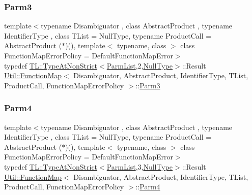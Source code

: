 \subsubsection{\texorpdfstring{Parm3}{Parm3}\hspace{0.1cm}{\footnotesize\ttfamily [2/2]}}
{\footnotesize\ttfamily template$<$typename Disambiguator , class Abstract\+Product , typename Identifier\+Type , class T\+List  = Null\+Type, typename Product\+Call  = Abstract\+Product ($\ast$)(), template$<$ typename, class $>$ class Function\+Map\+Error\+Policy = Default\+Function\+Map\+Error$>$ \\
typedef \mbox{\hyperlink{structUtil_1_1TL_1_1TypeAtNonStrict}{T\+L\+::\+Type\+At\+Non\+Strict}}$<$\mbox{\hyperlink{classUtil_1_1FunctionMap_a6cf0e6766cf6f20642ba61c4994bb477}{Parm\+List}},2,\mbox{\hyperlink{classUtil_1_1NullType}{Null\+Type}}$>$\+::Result \mbox{\hyperlink{classUtil_1_1FunctionMap}{Util\+::\+Function\+Map}}$<$ Disambiguator, Abstract\+Product, Identifier\+Type, T\+List, Product\+Call, Function\+Map\+Error\+Policy $>$\+::\mbox{\hyperlink{classUtil_1_1FunctionMap_a4578d42cd0723beba85654aa774d0145}{Parm3}}}

\mbox{\label{classUtil_1_1FunctionMap_a912703c1f39a6e219b2449183e48fb07}} 
\subsubsection{\texorpdfstring{Parm4}{Parm4}\hspace{0.1cm}{\footnotesize\ttfamily [1/2]}}
{\footnotesize\ttfamily template$<$typename Disambiguator , class Abstract\+Product , typename Identifier\+Type , class T\+List  = Null\+Type, typename Product\+Call  = Abstract\+Product ($\ast$)(), template$<$ typename, class $>$ class Function\+Map\+Error\+Policy = Default\+Function\+Map\+Error$>$ \\
typedef \mbox{\hyperlink{structUtil_1_1TL_1_1TypeAtNonStrict}{T\+L\+::\+Type\+At\+Non\+Strict}}$<$\mbox{\hyperlink{classUtil_1_1FunctionMap_a6cf0e6766cf6f20642ba61c4994bb477}{Parm\+List}},3,\mbox{\hyperlink{classUtil_1_1NullType}{Null\+Type}}$>$\+::Result \mbox{\hyperlink{classUtil_1_1FunctionMap}{Util\+::\+Function\+Map}}$<$ Disambiguator, Abstract\+Product, Identifier\+Type, T\+List, Product\+Call, Function\+Map\+Error\+Policy $>$\+::\mbox{\hyperlink{classUtil_1_1FunctionMap_a912703c1f39a6e219b2449183e48fb07}{Parm4}}}

